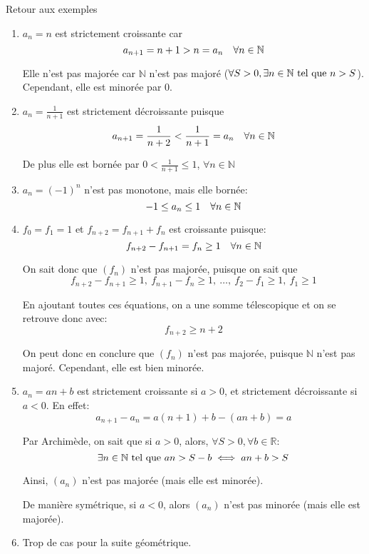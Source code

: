 \documentclass[a4paper]{article}
\begin{document}
\begin{parag}{Retour aux exemples}
   \begin{enumerate}[left=0pt]
       \item $a_n = n$ est strictement croissante car 
       \[a_{n + 1} = n + 1 > n = a_{n} \quad \forall n \in \mathbb{N}\]

       Elle n'est pas majorée car $\mathbb{N}$ n'est pas majoré ($\forall S > 0, \exists n \in \mathbb{N} \text{ tel que } n > S$). Cependant, elle est minorée par 0. 
       \item $a_n = \frac{1}{n+1}$ est strictement décroissante puisque 
       \[a_{n + 1} = \frac{1}{n+2} < \frac{1}{n+1} = a_n \quad \forall n \in \mathbb{N}\]

       De plus elle est bornée par $0 < \frac{1}{n+1} \leq 1$, $\forall n \in \mathbb{N}$

       \item $a_n = \left(-1\right)^{n}$ n'est pas monotone, mais elle bornée: 
       \[-1 \leq a_n \leq 1\quad\forall n \in \mathbb{N}\]

       \item $f_0 = f_1 = 1$ et $f_{n + 2} = f_{n+1} + f_n$ est croissante puisque: 
       \[f_{n+2} - f_{n+1} = f_n \geq 1 \quad \forall n \in \mathbb{N}\]
       
       On sait donc que $\left(f_n\right)$ n'est pas majorée, puisque on sait que 
       \[f_{n + 2} - f_{n + 1} \geq 1,\ f_{n + 1} - f_{n} \geq 1,\ \ldots,\ f_2 - f_1 \geq 1,\ f_1 \geq 1\]

       En ajoutant toutes ces équations, on a une somme télescopique et on se retrouve donc avec: 
       \[f_{n + 2} \geq n + 2\]

       On peut donc en conclure que $\left(f_n\right)$ n'est pas majorée, puisque $\mathbb{N}$ n'est pas majoré. Cependant, elle est bien minorée.

       \item $a_n = an + b$ est strictement croissante si $a > 0$, et strictement décroissante si $a < 0$. En effet: 
       \[a_{n + 1 } - a_n = a\left(n+1\right) + b - \left(an + b\right) = a\]

   Par Archimède, on sait que si $a > 0$, alors, $\forall S > 0, \forall b \in \mathbb{R}$: 
   \[\exists n \in \mathbb{N} \text{ tel que } an > S - b \iff an + b > S\]

       Ainsi, $\left(a_n\right)$ n'est pas majorée (mais elle est minorée). 

       De manière symétrique, si $a < 0$, alors $\left(a_n\right)$ n'est pas minorée (mais elle est majorée).
       \item Trop de cas pour la suite géométrique.
   \end{enumerate}
\end{parag}
\end{document}
